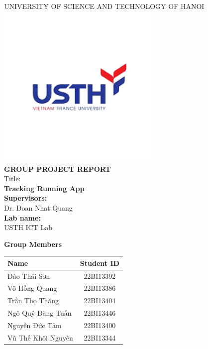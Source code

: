\documentclass[a4paper,12pt]{report}
\begin{document}
\thispagestyle{empty}

\begin{center}
    {\LARGE UNIVERSITY OF SCIENCE AND TECHNOLOGY OF HANOI \\[5pt]}
    \includegraphics[height=8cm]{intro/usth_logo.png} \\[10pt]
    {\Huge \textbf{GROUP PROJECT REPORT} \\[30pt]}
    {\huge Title: \\[5pt]}
    {\huge \textbf{Tracking Running App} \\[30pt]}
    {\large \textbf{Supervisors:} \\ Dr. Doan Nhat Quang \\[30pt]}
    {\large \textbf{Lab name:} \\ USTH ICT Lab \\[30pt]}
    \date{}
    \newpage
    \begin{table}[h!]
    \centering 
    \huge \textbf{Group Members}\\[100pt]
    \begin{tabular}{|l|c|}
    \hline
    \textbf{Name}                & \textbf{Student ID} \\ \hline
    Đào Thái Sơn                 & 22BI13392           \\ \hline
    Võ Hồng Quang                & 22BI13386           \\ \hline
    Trần Thọ Thăng               & 22BI13404           \\ \hline
    Ngô Quý Đăng Tuấn           & 22BI13446           \\ \hline
    Nguyễn Đức Tâm               & 22BI13400           \\ \hline
    Vũ Thế Khôi Nguyên          & 22BI13344           \\ \hline
    \end{tabular}
    \label{tab:group_members}
    \end{table}
\end{center}
\end{document}
